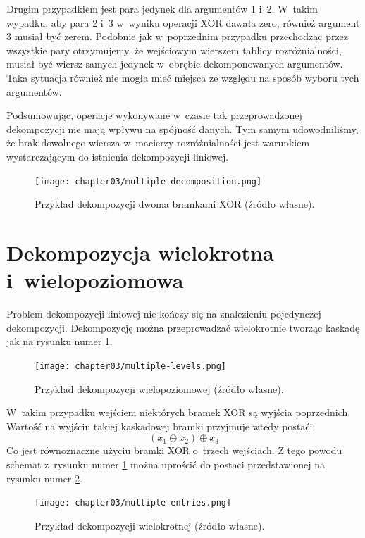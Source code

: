 Drugim przypadkiem jest para jedynek dla argumentów 1 i~2.
W~takim wypadku,
aby para 2 i~3 w~wyniku operacji XOR dawała zero,
również argument 3 musiał być zerem.
Podobnie jak w~poprzednim przypadku przechodząc przez wszystkie pary otrzymujemy,
że wejściowym wierszem tablicy rozróżnialności,
musiał być wiersz samych jedynek w~obrębie dekomponowanych argumentów.
Taka sytuacja również nie mogła mieć miejsca ze względu na sposób wyboru tych argumentów.

Podsumowując,
operacje wykonywane w~czasie tak przeprowadzonej dekompozycji nie mają wpływu na spójność danych.
Tym samym udowodniliśmy,
że brak dowolnego wiersza w~macierzy rozróżnialności jest warunkiem wystarczającym do istnienia dekompozycji liniowej.

\begin{figure}[H]
\centering
\texttt{[image: chapter03/multiple-decomposition.png]}
\caption{Przykład dekompozycji dwoma bramkami XOR (źródło własne).}
\end{figure}

\section{Dekompozycja wielokrotna i~wielopoziomowa}

Problem dekompozycji liniowej nie kończy się na znalezieniu pojedynczej dekompozycji.
Dekompozycję można przeprowadzać wielokrotnie tworząc kaskadę jak na rysunku numer \ref{fig:multiple-levels}.

\begin{figure}[H]
\centering
\texttt{[image: chapter03/multiple-levels.png]}
\caption{Przykład dekompozycji wielopoziomowej (źródło własne).}
\label{fig:multiple-levels}
\end{figure}

W~takim przypadku wejściem niektórych bramek XOR są wyjścia poprzednich.
Wartość na wyjściu takiej kaskadowej bramki przyjmuje wtedy postać:
\begin{equation}
(x_1 \oplus x_2) \oplus x_3
\end{equation}
Co jest równoznaczne użyciu bramki XOR o~trzech wejściach.
Z tego powodu schemat z~rysunku numer \ref{fig:multiple-levels} można uprościć do postaci przedstawionej na rysunku numer \ref{fig:multiple-entries}.

\begin{figure}[H]
\centering
\texttt{[image: chapter03/multiple-entries.png]}
\caption{Przykład dekompozycji wielokrotnej (źródło własne).}
\label{fig:multiple-entries}
\end{figure}

